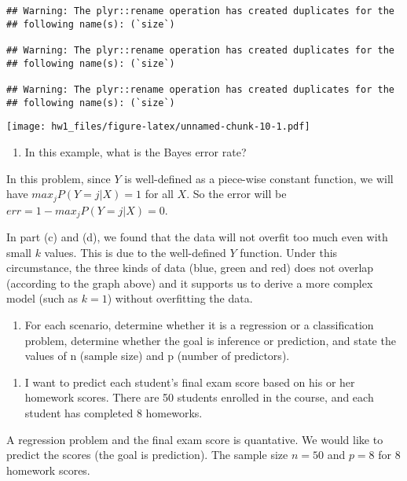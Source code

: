 \documentclass[]{article}
\providecommand{\tightlist}{%
  \setlength{\itemsep}{0pt}\setlength{\parskip}{0pt}}
\begin{document}
\begin{verbatim}
## Warning: The plyr::rename operation has created duplicates for the
## following name(s): (`size`)

## Warning: The plyr::rename operation has created duplicates for the
## following name(s): (`size`)

## Warning: The plyr::rename operation has created duplicates for the
## following name(s): (`size`)
\end{verbatim}

\texttt{[image: hw1\_files/figure-latex/unnamed-chunk-10-1.pdf]}

\begin{enumerate}
\def\labelenumi{(\alph{enumi})}
\setcounter{enumi}{4}
\tightlist
\item
  In this example, what is the Bayes error rate?
\end{enumerate}

In this problem, since \(Y\) is well-defined as a piece-wise constant
function, we will have \(max_j P(Y=j|X)=1\) for all \(X\). So the error
will be \(err = 1 - max_j P(Y=j|X) = 0\).

In part (c) and (d), we found that the data will not overfit too much
even with small \(k\) values. This is due to the well-defined \(Y\)
function. Under this circumstance, the three kinds of data (blue, green
and red) does not overlap (according to the graph above) and it supports
us to derive a more complex model (such as \(k=1\)) without overfitting
the data.

\begin{enumerate}
\def\labelenumi{\arabic{enumi}.}
\setcounter{enumi}{2}
\tightlist
\item
  For each scenario, determine whether it is a regression or a
  classification problem, determine whether the goal is inference or
  prediction, and state the values of n (sample size) and p (number of
  predictors).
\end{enumerate}

\begin{enumerate}
\def\labelenumi{(\alph{enumi})}
\tightlist
\item
  I want to predict each student's final exam score based on his or her
  homework scores. There are 50 students enrolled in the course, and
  each student has completed 8 homeworks.
\end{enumerate}

A regression problem and the final exam score is quantative. We would
like to predict the scores (the goal is prediction). The sample size
\(n=50\) and \(p=8\) for 8 homework scores.
\end{document}

